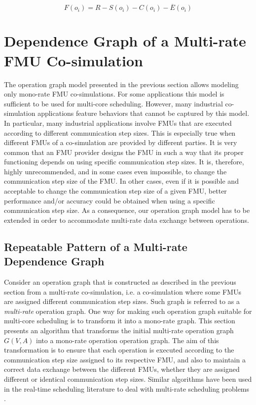 \begin{equation}
	F(o_i) = R - S(o_i) - C(o_i) - \overline{E}(o_i) 
	\label{eq:flex}
\end{equation}

\section{\label{sec:opgraph}Dependence Graph of a Multi-rate FMU Co-simulation}

The operation graph model presented in the previous section allows modeling only mono-rate FMU co-simulations. For some applications this model is sufficient to be used for multi-core scheduling. However, many industrial co-simulation applications feature behaviors that cannot be captured by this model. In particular, many industrial applications involve FMUs that are executed according to different communication step sizes. This is especially true when different FMUs of a co-simulation are provided by different parties. It is very common that an FMU provider designs the FMU in such a way that its proper functioning depends on using specific communication step sizes. It is, therefore, highly unrecommended, and in some cases even impossible, to change the communication step size of the FMU. In other cases, even if it is possible and acceptable to change the communication step size of a given FMU, better performance and/or accuracy could be obtained when using a specific communication step size. As a consequence, our operation graph model has to be extended in order to accommodate multi-rate data exchange between operations. 

\subsection{Repeatable Pattern of a Multi-rate Dependence Graph}

Consider an operation graph that is constructed as described in the previous section from a multi-rate co-simulation, i.e. a co-simulation where some FMUs are assigned different communication step sizes. Such graph is referred to as a \textit{multi-rate} operation graph. One way for making such operation graph suitable for multi-core scheduling is to transform it into a mono-rate graph. This section presents an algorithm that transforms the initial multi-rate operation graph $G(V,A)$ into a mono-rate operation operation graph. %
The aim of this transformation is to ensure that each operation is executed according to the communication step size assigned to its respective FMU, and also to maintain a correct data exchange between the different FMUs, whether they are assigned different or identical communication step sizes. Similar algorithms have been used in the real-time scheduling literature to deal with multi-rate scheduling problems \cite{kermia:2009, ramamritham:1995}.

